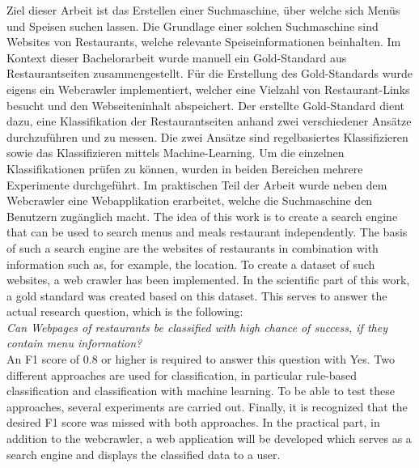 
Ziel dieser Arbeit ist das Erstellen einer Suchmaschine, über welche sich Menüs und Speisen suchen lassen.
Die Grundlage einer solchen Suchmaschine sind Websites von Restaurants, welche relevante Speiseinformationen beinhalten.
Im Kontext dieser Bachelorarbeit wurde manuell ein Gold-Standard aus Restaurantseiten zusammengestellt.
Für die Erstellung des Gold-Standards wurde eigens ein Webcrawler implementiert, welcher eine Vielzahl von Restaurant-Links besucht und den Webseiteninhalt abspeichert.
Der erstellte Gold-Standard dient dazu, eine Klassifikation der Restaurantseiten anhand zwei verschiedener Ansätze durchzuführen und zu messen.
Die zwei Ansätze sind regelbasiertes Klassifizieren sowie das Klassifizieren mittels Machine-Learning.
Um die einzelnen Klassifikationen prüfen zu können, wurden in beiden Bereichen mehrere Experimente durchgeführt.
Im praktischen Teil der Arbeit wurde neben dem Webcrawler eine Webapplikation erarbeitet, welche die Suchmaschine den Benutzern zugänglich macht.
The idea of this work is to create a search engine that can be used to search menus and meals restaurant independently.
The basis of such a search engine are the websites of restaurants in combination with information such as, for example, the location.
To create a dataset of such websites, a web crawler has been implemented.
In the scientific part of this work, a gold standard was created based on this dataset.
This serves to answer the actual research question, which is the following: \\
\emph{Can Webpages of restaurants be classified with high chance of success, if they contain menu information?} \\
An F1 score of 0.8 or higher is required to answer this question with \glqq Yes\grqq{}.
Two different approaches are used for classification, in particular rule-based classification and classification with machine learning.
To be able to test these approaches, several experiments are carried out.
Finally, it is recognized that the desired F1 score was missed with both approaches.
In the practical part, in addition to the webcrawler, a web application will be developed which serves as a search engine and displays the classified data to a user.